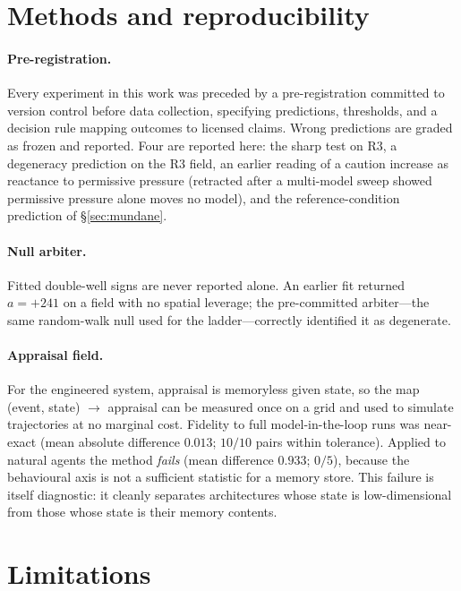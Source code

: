 \documentclass[11pt]{article}
\begin{document}
\section{Methods and reproducibility}
\label{sec:methods}

\paragraph{Pre-registration.} Every experiment in this work was preceded by a
pre-registration committed to version control before data collection, specifying
predictions, thresholds, and a decision rule mapping outcomes to licensed claims.
Wrong predictions are graded as frozen and reported. Four are reported here: the sharp
test on R3, a degeneracy prediction on the R3 field, an earlier reading of a caution
increase as reactance to permissive pressure (retracted after a multi-model sweep
showed permissive pressure alone moves no model), and the reference-condition
prediction of \S\ref{sec:mundane}.

\paragraph{Null arbiter.} Fitted double-well signs are never reported alone. An
earlier fit returned $a = +241$ on a field with no spatial leverage; the pre-committed
arbiter---the same random-walk null used for the ladder---correctly identified it as
degenerate.

\paragraph{Appraisal field.} For the engineered system, appraisal is memoryless given
state, so the map (event, state) $\rightarrow$ appraisal can be measured once on a
grid and used to simulate trajectories at no marginal cost. Fidelity to full
model-in-the-loop runs was near-exact (mean absolute difference $0.013$; $10/10$ pairs
within tolerance). Applied to natural agents the method \emph{fails} (mean difference
$0.933$; $0/5$), because the behavioural axis is not a sufficient statistic for a
memory store. This failure is itself diagnostic: it cleanly separates architectures
whose state is low-dimensional from those whose state is their memory contents.

\section{Limitations}
\end{document}
